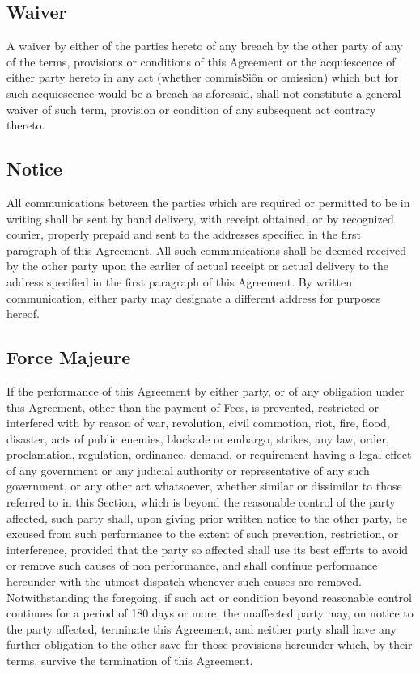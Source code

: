 \documentclass[letterpaper,10pt,openany,oneside,english]{sphinxmanual}
\begin{document}
\subsection{Waiver}
\label{\detokenize{miscellaneous:waiver}}
A waiver by either of the parties hereto of any breach by the other party of any of the terms, provisions or conditions of this Agreement or the acquiescence of either party hereto in any act (whether commisSiôn or omission) which but for such acquiescence would be a breach as aforesaid, shall not constitute a general waiver of such term, provision or condition of any subsequent act contrary thereto.


\subsection{Notice}
\label{\detokenize{miscellaneous:notice}}
All communications between the parties which are required or permitted to be in writing shall be sent by hand delivery, with receipt obtained, or by recognized courier, properly prepaid and sent to the addresses specified in the first paragraph of this Agreement. All such communications shall be deemed received by the other party upon the earlier of actual receipt or actual delivery to the address specified in the first paragraph of this Agreement. By written communication, either party may designate a different address for purposes hereof.


\subsection{Force Majeure}
\label{\detokenize{miscellaneous:force-majeure}}
If the performance of this Agreement by either party, or of any obligation under this Agreement, other than the payment of Fees, is prevented, restricted or interfered with by reason of war, revolution, civil commotion, riot, fire, flood, disaster, acts of public enemies, blockade or embargo, strikes, any law, order, proclamation, regulation, ordinance, demand, or requirement having a legal effect of any government or any judicial authority or representative of any such government, or any other act whatsoever, whether similar or dissimilar to those referred to in this Section, which is beyond the reasonable control of the party affected, such party shall, upon giving prior written notice to the other party, be excused from such performance to the extent of such prevention, restriction, or interference, provided that the party so affected shall use its best efforts to avoid or remove such causes of non performance, and shall continue performance hereunder with the utmost dispatch whenever such causes are removed. Notwithstanding the foregoing, if such act or condition beyond reasonable control continues for a period of 180 days or more, the unaffected party may, on notice to the party affected, terminate this Agreement, and neither party shall have any further obligation to the other save for those provisions hereunder which, by their terms, survive the termination of this Agreement.
\end{document}
